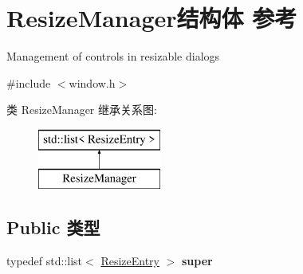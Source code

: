 \hypertarget{struct_resize_manager}{}\section{Resize\+Manager结构体 参考}
\label{struct_resize_manager}


Management of controls in resizable dialogs  




{\ttfamily \#include $<$window.\+h$>$}

类 Resize\+Manager 继承关系图\+:\begin{figure}[H]
\begin{center}
\leavevmode
\includegraphics[height=2.000000cm]{struct_resize_manager}
\end{center}
\end{figure}
\subsection*{Public 类型}
\begin{DoxyCompactItemize}
\item 
\mbox{\label{struct_resize_manager_ae5c5e15d8d63490f9d11feaca1200de2}} 
typedef std\+::list$<$ \hyperlink{struct_resize_entry}{Resize\+Entry} $>$ {\bfseries super}
\end{DoxyCompactItemize}
